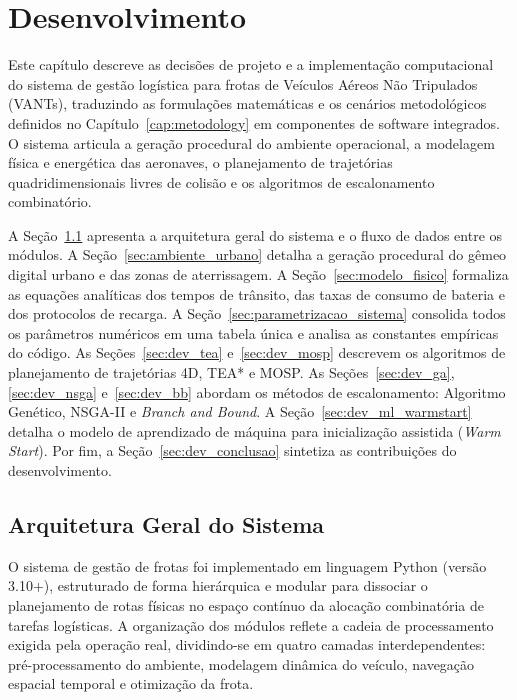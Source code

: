 \chapter{Desenvolvimento}\label{cap:development}

Este capítulo descreve as decisões de projeto e a implementação computacional do sistema de gestão logística para frotas de Veículos Aéreos Não Tripulados (VANTs), traduzindo as formulações matemáticas e os cenários metodológicos definidos no Capítulo~\ref{cap:metodology} em componentes de software integrados. O sistema articula a geração procedural do ambiente operacional, a modelagem física e energética das aeronaves, o planejamento de trajetórias quadridimensionais livres de colisão e os algoritmos de escalonamento combinatório.

A Seção~\ref{sec:arquitetura_sistema} apresenta a arquitetura geral do sistema e o fluxo de dados entre os módulos. A Seção~\ref{sec:ambiente_urbano} detalha a geração procedural do gêmeo digital urbano e das zonas de aterrissagem. A Seção~\ref{sec:modelo_fisico} formaliza as equações analíticas dos tempos de trânsito, das taxas de consumo de bateria e dos protocolos de recarga. A Seção~\ref{sec:parametrizacao_sistema} consolida todos os parâmetros numéricos em uma tabela única e analisa as constantes empíricas do código. As Seções~\ref{sec:dev_tea} e~\ref{sec:dev_mosp} descrevem os algoritmos de planejamento de trajetórias 4D, TEA* e MOSP. As Seções~\ref{sec:dev_ga}, \ref{sec:dev_nsga} e~\ref{sec:dev_bb} abordam os métodos de escalonamento: Algoritmo Genético, NSGA-II e \textit{Branch and Bound}. A Seção~\ref{sec:dev_ml_warmstart} detalha o modelo de aprendizado de máquina para inicialização assistida (\textit{Warm Start}). Por fim, a Seção~\ref{sec:dev_conclusao} sintetiza as contribuições do desenvolvimento.

\section{Arquitetura Geral do Sistema}\label{sec:arquitetura_sistema}

O sistema de gestão de frotas foi implementado em linguagem Python (versão 3.10+), estruturado de forma hierárquica e modular para dissociar o planejamento de rotas físicas no espaço contínuo da alocação combinatória de tarefas logísticas. A organização dos módulos reflete a cadeia de processamento exigida pela operação real, dividindo-se em quatro camadas interdependentes: pré-processamento do ambiente, modelagem dinâmica do veículo, navegação espacial temporal e otimização da frota.

